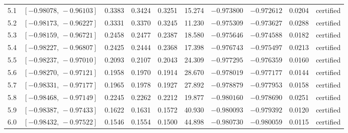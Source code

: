 {\begin{center}
\begin{tabular}{@{}lccccccccl@{}}
\rule[-3pt]{0pt}{11.5pt} 5.1 & $[-0.98078,\,-0.96103]$ & 0.3383 & 0.3424 & 0.3251 & 15.274 & $-0.973800$ & $-0.972612$ & 0.0204 & certified \\
\rule[-3pt]{0pt}{11.5pt} 5.2 & $[-0.98173,\,-0.96227]$ & 0.3331 & 0.3370 & 0.3245 & 11.230 & $-0.975309$ & $-0.973627$ & 0.0288 & certified \\
\rule[-3pt]{0pt}{11.5pt} 5.3 & $[-0.98159,\,-0.96721]$ & 0.2458 & 0.2477 & 0.2387 & 18.580 & $-0.975646$ & $-0.974588$ & 0.0182 & certified \\
\rule[-3pt]{0pt}{11.5pt} 5.4 & $[-0.98227,\,-0.96807]$ & 0.2425 & 0.2444 & 0.2368 & 17.398 & $-0.976743$ & $-0.975497$ & 0.0213 & certified \\
\rule[-3pt]{0pt}{11.5pt} 5.5 & $[-0.98237,\,-0.97010]$ & 0.2093 & 0.2107 & 0.2043 & 24.309 & $-0.977295$ & $-0.976359$ & 0.0160 & certified \\
\rule[-3pt]{0pt}{11.5pt} 5.6 & $[-0.98270,\,-0.97121]$ & 0.1958 & 0.1970 & 0.1914 & 28.670 & $-0.978019$ & $-0.977177$ & 0.0144 & certified \\
\rule[-3pt]{0pt}{11.5pt} 5.7 & $[-0.98331,\,-0.97177]$ & 0.1965 & 0.1978 & 0.1927 & 27.892 & $-0.978879$ & $-0.977953$ & 0.0158 & certified \\
\rule[-3pt]{0pt}{11.5pt} 5.8 & $[-0.98468,\,-0.97149]$ & 0.2245 & 0.2262 & 0.2212 & 19.877 & $-0.980160$ & $-0.978690$ & 0.0251 & certified \\
\rule[-3pt]{0pt}{11.5pt} 5.9 & $[-0.98387,\,-0.97433]$ & 0.1622 & 0.1631 & 0.1572 & 40.930 & $-0.980093$ & $-0.979392$ & 0.0120 & certified \\
\rule[-3pt]{0pt}{11.5pt} 6.0 & $[-0.98432,\,-0.97522]$ & 0.1546 & 0.1554 & 0.1500 & 44.898 & $-0.980730$ & $-0.980059$ & 0.0115 & certified \\
\bottomrule
\end{tabular}\end{center}
}
